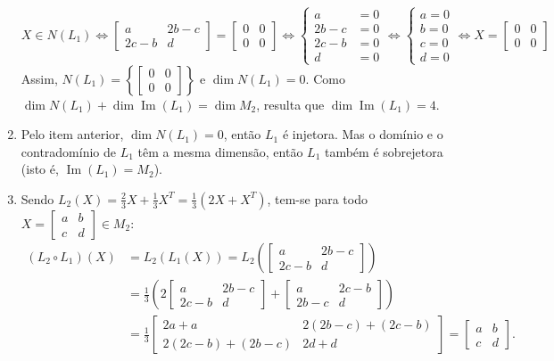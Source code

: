 \documentclass[12pt,a4paper]{article}
\newcommand*\im[1]{\operatorname{Im}\left(#1\right)}
\begin{document}
\begin{ExerciseList}
\begin{enumerate}
\[
X \in N(L_1)
\Leftrightarrow
\begin{bmatrix}
a & 2b-c \\ 2c-b & d
\end{bmatrix}
=
\begin{bmatrix}
0 & 0 \\ 0 & 0
\end{bmatrix}
\Leftrightarrow
\begin{cases}
a&=0\\
2b-c&=0\\
2c-b&=0\\
d&=0
\end{cases}
\Leftrightarrow
\begin{cases}
a=0\\
b=0\\
c=0\\
d=0
\end{cases}
\Leftrightarrow
X = \begin{bmatrix}
0 & 0 \\ 0 & 0
\end{bmatrix}
\]
Assim, $N(L_1) = \left\{ \begin{bmatrix}
0 & 0 \\ 0 & 0
\end{bmatrix} \right\}$ e $\dim{ N(L_1) } = 0$. Como $\dim{ N(L_1) } + \dim{ \im{L_1} } = \dim{ M_2 }$, resulta que $\dim{ \im{L_1} } = 4$.

\item Pelo item anterior, $\dim{ N(L_1) } = 0$, então $L_1$ é injetora. Mas o domínio e o contradomínio de $L_1$ têm a mesma dimensão, então $L_1$ também é sobrejetora (isto é, $\im{L_1} = M_2$).

\item Sendo $L_2(X) = \frac{2}{3}X +\frac{1}{3}X^T = \frac{1}{3}(2X + X^T)$, tem-se para todo $X = \begin{bmatrix}
a & b \\ c & d
\end{bmatrix} \in M_2$:
\begin{align*}
(L_2 \circ L_1)(X)
& = L_2 ( L_1(X) )
= L_2 \left( \begin{bmatrix}
a & 2b-c \\ 2c-b & d
\end{bmatrix} \right) \\
& = \frac{1}{3}
\left( 2\begin{bmatrix}
a & 2b-c \\ 2c-b & d
\end{bmatrix} + \begin{bmatrix}
a & 2c-b \\ 2b-c & d
\end{bmatrix} \right) \\
& = \frac{1}{3} \begin{bmatrix}
2a + a & 2(2b-c) + (2c-b) \\ 2(2c-b)+(2b-c) & 2d + d
\end{bmatrix}
= \begin{bmatrix}
a & b \\ c & d
\end{bmatrix}.
\end{align*}


\end{enumerate}
\end{ExerciseList}
\end{document}
